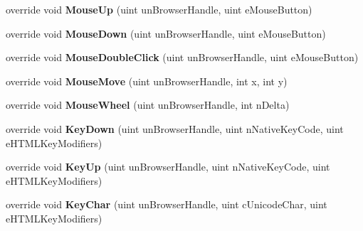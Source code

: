 \begin{DoxyCompactItemize}
override void {\bfseries Mouse\+Up} (uint un\+Browser\+Handle, uint e\+Mouse\+Button)
\item 
\mbox{\label{class_valve_1_1_steamworks_1_1_c_steam_h_t_m_l_surface_a4179a1b2d9b87021882d9bf4126e015f}} 
override void {\bfseries Mouse\+Down} (uint un\+Browser\+Handle, uint e\+Mouse\+Button)
\item 
\mbox{\label{class_valve_1_1_steamworks_1_1_c_steam_h_t_m_l_surface_af8f89b83edc57b555f259eec36bd5ad2}} 
override void {\bfseries Mouse\+Double\+Click} (uint un\+Browser\+Handle, uint e\+Mouse\+Button)
\item 
\mbox{\label{class_valve_1_1_steamworks_1_1_c_steam_h_t_m_l_surface_abb196915ade2194426e163876ae8445a}} 
override void {\bfseries Mouse\+Move} (uint un\+Browser\+Handle, int x, int y)
\item 
\mbox{\label{class_valve_1_1_steamworks_1_1_c_steam_h_t_m_l_surface_a3559b50ea0b5a974ec63bd94fb96e4b1}} 
override void {\bfseries Mouse\+Wheel} (uint un\+Browser\+Handle, int n\+Delta)
\item 
\mbox{\label{class_valve_1_1_steamworks_1_1_c_steam_h_t_m_l_surface_a1a4423aefdb6e4657b87110e349d4133}} 
override void {\bfseries Key\+Down} (uint un\+Browser\+Handle, uint n\+Native\+Key\+Code, uint e\+H\+T\+M\+L\+Key\+Modifiers)
\item 
\mbox{\label{class_valve_1_1_steamworks_1_1_c_steam_h_t_m_l_surface_a53cd29380735a98c7110fca0ca2078bb}} 
override void {\bfseries Key\+Up} (uint un\+Browser\+Handle, uint n\+Native\+Key\+Code, uint e\+H\+T\+M\+L\+Key\+Modifiers)
\item 
\mbox{\label{class_valve_1_1_steamworks_1_1_c_steam_h_t_m_l_surface_ad5b36d0f3dab39e2015270980b85fb48}} 
override void {\bfseries Key\+Char} (uint un\+Browser\+Handle, uint c\+Unicode\+Char, uint e\+H\+T\+M\+L\+Key\+Modifiers)
\item 

\end{DoxyCompactItemize}
